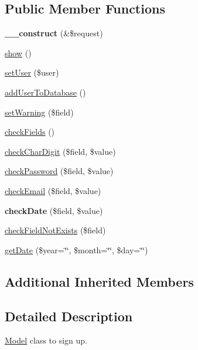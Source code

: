\subsection*{Public Member Functions}
\begin{DoxyCompactItemize}
\item 
\hypertarget{classSignUpModel_aae52ec1db27fb922288ac520b878f26a}{{\bfseries \+\_\+\+\_\+construct} (\&\$request)}\label{classSignUpModel_aae52ec1db27fb922288ac520b878f26a}

\item 
\hyperlink{classSignUpModel_a3d80b2fd00a974e0887f595cc7965212}{show} ()
\item 
\hyperlink{classSignUpModel_acd59c8e245153cf560a31aaba4f64773}{set\+User} (\$user)
\item 
\hyperlink{classSignUpModel_a93f4575092488361fb4fd5f414ffdb48}{add\+User\+To\+Database} ()
\item 
\hyperlink{classSignUpModel_a3c4428291475bd3312836fa81f1a75c7}{set\+Warning} (\$field)
\item 
\hyperlink{classSignUpModel_a1e62f6ed2749da2c1330748adb9afb03}{check\+Fields} ()
\item 
\hyperlink{classSignUpModel_a9143bf2de7d986b7a87835a305fead69}{check\+Char\+Digit} (\$field, \$value)
\item 
\hyperlink{classSignUpModel_afb9cdf85f663e052513dba210c4c42a3}{check\+Password} (\$field, \$value)
\item 
\hyperlink{classSignUpModel_ac2454823e6ba92643040f0949ea00d7a}{check\+Email} (\$field, \$value)
\item 
\hypertarget{classSignUpModel_a0db60aa03b0f53ae8d8ba41f90117d7a}{{\bfseries check\+Date} (\$field, \$value)}\label{classSignUpModel_a0db60aa03b0f53ae8d8ba41f90117d7a}

\item 
\hyperlink{classSignUpModel_a56bbe709052d4774939c95080251a20f}{check\+Field\+Not\+Exists} (\$field)
\item 
\hyperlink{classSignUpModel_ac147a7f9bf405c3e98fe15f5ebb219ab}{get\+Date} (\$year=\char`\"{}\char`\"{}, \$month=\char`\"{}\char`\"{}, \$day=\char`\"{}\char`\"{})
\end{DoxyCompactItemize}
\subsection*{Additional Inherited Members}


\subsection{Detailed Description}
\hyperlink{classModel}{Model} class to sign up.

